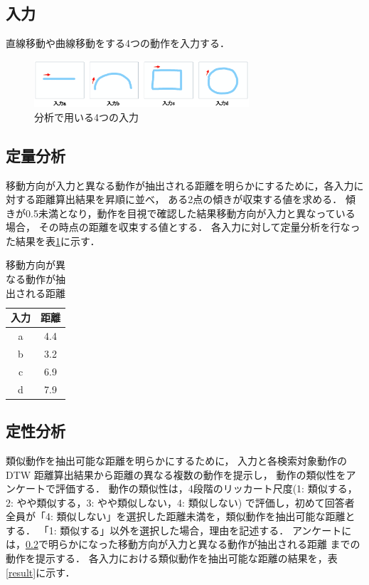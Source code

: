 \documentclass[twocolumn]{jarticle} %
\begin{document}
\subsection{入力}
直線移動や曲線移動をする4つの動作を入力する．

\begin{figure}[H]
    \centering
    \includegraphics[width=8cm]{resume-input.eps}
    \caption{分析で用いる4つの入力}
    \label{systemdisplay}
\end{figure}

\subsection{定量分析}
\label{teiryou}
移動方向が入力と異なる動作が抽出される距離を明らかにするために，各入力に対する距離算出結果を昇順に並べ，
ある2点の傾きが収束する値を求める．
傾きが0.5未満となり，動作を目視で確認した結果移動方向が入力と異なっている場合，
その時点の距離を収束する値とする．
各入力に対して定量分析を行なった結果を表\ref{quantitativeresult}に示す．
        
\begin{table}[H]
    \caption{移動方向が異なる動作が抽出される距離}
    \label{quantitativeresult}
    \centering
    \begin{tabular}{c|c}
    \hline
    入力 & 距離 \\
    \hline \hline
    a & 4.4 \\
    \hline
    b & 3.2 \\
    \hline
    c & 6.9 \\
    \hline
    d & 7.9 \\
    \hline
    \end{tabular}
\end{table}

\subsection{定性分析}
\label{teisei}
類似動作を抽出可能な距離を明らかにするために，
入力と各検索対象動作の DTW 距離算出結果から距離の異なる複数の動作を提示し，
動作の類似性をアンケートで評価する．
動作の類似性は，4段階のリッカート尺度(1: 類似する，2: やや類似する，3: やや類似しない，4: 類似しない)
で評価し，初めて回答者全員が「4: 類似しない」を選択した距離未満を，類似動作を抽出可能な距離とする．
「1: 類似する」以外を選択した場合，理由を記述する．
アンケートには，\ref{teiryou}で明らかになった移動方向が入力と異なる動作が抽出される距離
までの動作を提示する．
各入力における類似動作を抽出可能な距離の結果を，表\ref{result}に示す．
\end{document}
